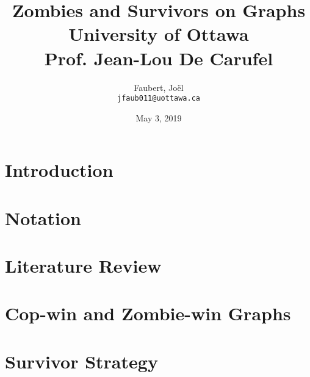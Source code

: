 \documentclass[letterpaper, 12pt]{report}
\author{
  Faubert, Jo\"el\\	\texttt{jfaub011@uottawa.ca}
}
\title{
	{Zombies and Survivors on Graphs}\\
	{\large University of Ottawa} \\
  {\large Prof. Jean-Lou De Carufel}
}
\date{May 3, 2019}
\theoremstyle{definition}
\begin{document}
\nocite{*}

\hypersetup{pageanchor=false}
\begin{titlepage}
\maketitle
\end{titlepage}
\hypersetup{pageanchor=true}


%

\tableofcontents

\cleardoublepage{}

\section{Introduction}


\section{Notation}


\section{Literature Review}


%

\section{Cop-win and Zombie-win Graphs}


\section{Survivor Strategy}


% 
\end{document}
